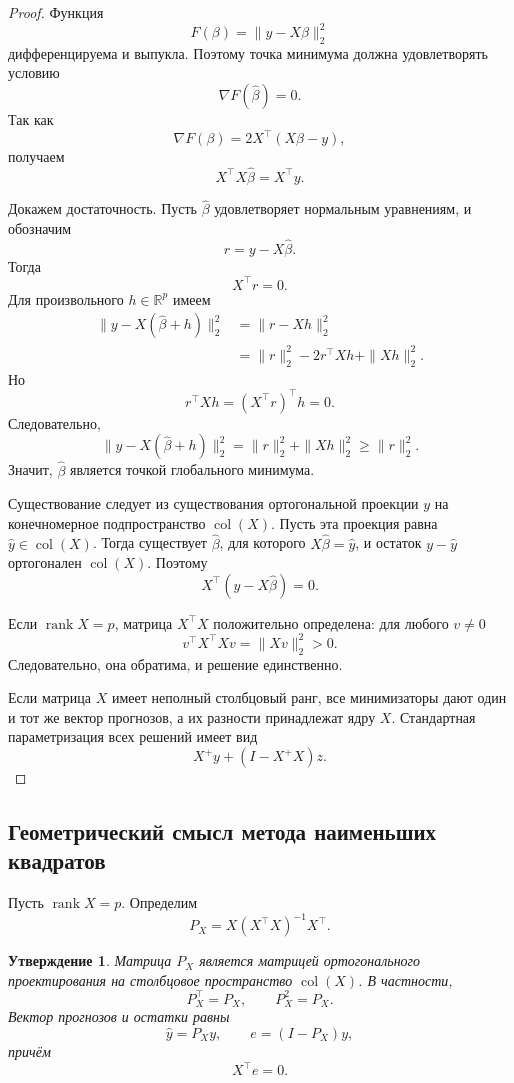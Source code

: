 \documentclass[12pt,a4paper]{article}
\newtheorem{proposition}[theorem]{Утверждение}
\theoremstyle{definition}
\theoremstyle{remark}
\newcommand{\R}{\mathbb{R}}
\newcommand{\rank}{\operatorname{rank}}
\newcommand{\col}{\operatorname{col}}
\begin{document}
\begin{proof}
Функция
\[
    F(\beta)=\|y-X\beta\|_2^2
\]
дифференцируема и выпукла. Поэтому точка минимума должна удовлетворять
условию
\[
    \nabla F(\widehat\beta)=0.
\]
Так как
\[
    \nabla F(\beta)=2X^\top(X\beta-y),
\]
получаем
\[
    X^\top X\widehat\beta=X^\top y.
\]

Докажем достаточность. Пусть $\widehat\beta$ удовлетворяет нормальным
уравнениям, и обозначим
\[
    r=y-X\widehat\beta.
\]
Тогда
\[
    X^\top r=0.
\]
Для произвольного $h\in\R^p$ имеем
\[
\begin{split}
    \|y-X(\widehat\beta+h)\|_2^2
    &=
    \|r-Xh\|_2^2\\
    &=
    \|r\|_2^2
    -2r^\top Xh
    +
    \|Xh\|_2^2.
\end{split}
\]
Но
\[
    r^\top Xh=(X^\top r)^\top h=0.
\]
Следовательно,
\[
    \|y-X(\widehat\beta+h)\|_2^2
    =
    \|r\|_2^2+\|Xh\|_2^2
    \geq
    \|r\|_2^2.
\]
Значит, $\widehat\beta$ является точкой глобального минимума.

Существование следует из существования ортогональной проекции
$y$ на конечномерное подпространство $\col(X)$. Пусть эта проекция равна
$\widehat y\in\col(X)$. Тогда существует $\widehat\beta$, для которого
$X\widehat\beta=\widehat y$, и остаток $y-\widehat y$ ортогонален
$\col(X)$. Поэтому
\[
    X^\top(y-X\widehat\beta)=0.
\]

Если $\rank X=p$, матрица $X^\top X$ положительно определена:
для любого $v\ne 0$
\[
    v^\top X^\top Xv=\|Xv\|_2^2>0.
\]
Следовательно, она обратима, и решение единственно.

Если матрица $X$ имеет неполный столбцовый ранг, все минимизаторы дают
один и тот же вектор прогнозов, а их разности принадлежат ядру $X$.
Стандартная параметризация всех решений имеет вид
\[
    X^+y+(I-X^+X)z.
\]
\end{proof}

\subsection{Геометрический смысл метода наименьших квадратов}

Пусть $\rank X=p$. Определим
\[
    P_X=X(X^\top X)^{-1}X^\top.
\]

\begin{proposition}
Матрица $P_X$ является матрицей ортогонального проектирования на
столбцовое пространство $\col(X)$. В частности,
\[
    P_X^\top=P_X,
    \qquad
    P_X^2=P_X.
\]
Вектор прогнозов и остатки равны
\[
    \widehat y=P_Xy,
    \qquad
    e=(I-P_X)y,
\]
причём
\[
    X^\top e=0.
\]
\end{proposition}
\end{document}

